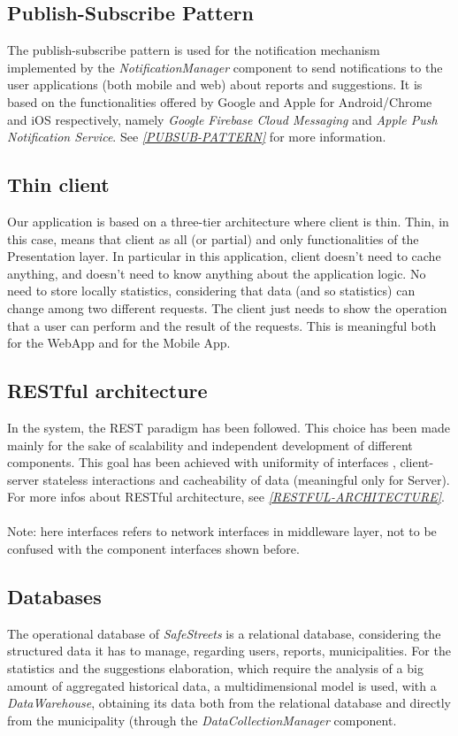\documentclass[a4paper]{report}
\begin{document}
\subsection{Publish-Subscribe Pattern}
The publish-subscribe pattern is used for the notification mechanism implemented by the \textit{NotificationManager} component to send notifications to the user applications (both mobile and web) about reports and suggestions. It is based on the functionalities offered by Google and Apple for Android/Chrome and iOS respectively, namely \textit{Google Firebase Cloud Messaging} and \textit{Apple Push Notification Service}. \label{use:pubsub-pattern} See \hyperref[ref:pubsub-pattern]{\textit{[PUBSUB-PATTERN]}} for more information.
\subsection{Thin client}
Our application is based on a three-tier architecture where client is thin. Thin, in this case, means that client as all (or partial) and only functionalities of the Presentation layer. In particular in this application, client doesn't need to cache anything, and doesn't need to know anything about the application logic. No need to store locally statistics, considering that data (and so statistics) can change among two different requests. The client just needs to show the operation that a user can perform and the result of the requests. This is meaningful both for the WebApp and for the Mobile App. 
\subsection{RESTful architecture}
In the system, the REST paradigm has been followed. This choice has been made mainly for the sake of scalability and independent development of different components. This goal has been achieved with uniformity of interfaces , client-server stateless interactions and cacheability of data (meaningful only for Server). For more infos about RESTful architecture, see \hyperref[ref:RESTful-architecture]{\textit{[RESTFUL-ARCHITECTURE]}}. \\
\\
Note: here interfaces refers to network interfaces in middleware layer, not to be confused with the component interfaces shown before.
\subsection{Databases}
The operational database of \textit{SafeStreets} is a relational database, considering the structured data it has to manage, regarding users, reports, municipalities. For the statistics and the suggestions elaboration, which require the analysis of a big amount of aggregated historical data, a multidimensional model is used, with a \textit{DataWarehouse}, obtaining its data both from the relational database and directly from the municipality (through the \textit{DataCollectionManager} component.
 
\end{document}
